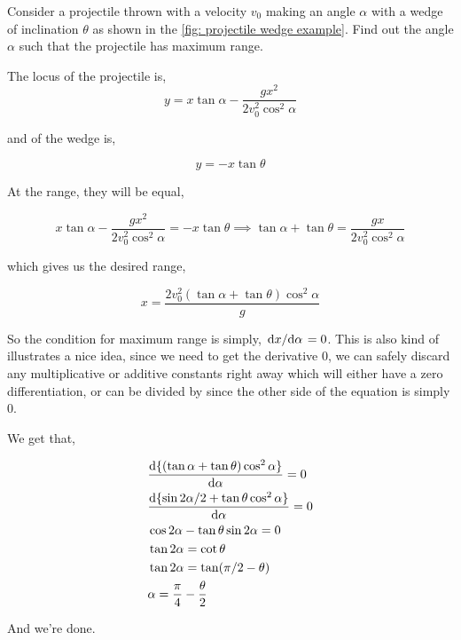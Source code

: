 \begin{example}
Consider a projectile thrown with a velocity \(v_0\) making an angle \(\alpha\) with 
a wedge of inclination \(\theta\) as shown in the \cref{fig: projectile wedge example}. Find out the angle \(\alpha\) 
such that the projectile has maximum range.    

\begin{soln}
    The locus of the projectile is, 
    \begin{equation*}
        y = x\tan\alpha - \frac{gx^2}{2v_0^2\cos^2\alpha}
    \end{equation*}

    and of the wedge is, 

    \begin{equation*}
        y = -x\tan\theta
    \end{equation*}

    At the range, they will be equal,

    \begin{equation*}
        x\tan\alpha - \frac{gx^2}{2v_0^2\cos^2\alpha} = -x\tan\theta \implies 
        \tan\alpha + \tan\theta = \frac{gx}{2v_0^2\cos^2\alpha}
    \end{equation*}

    which gives us the desired range, 

    \begin{equation*}
        x = \frac{2v_0^2(\tan\alpha + \tan\theta)\cos^2\alpha}{g}
    \end{equation*}

    So the condition for maximum range is simply, \(\dv*{x}{\alpha} = 0\). This is also 
    kind of illustrates a nice idea, since we need to get the derivative \(0\), we
    can safely discard any multiplicative or additive constants right away which will 
    either have a zero differentiation, or can be divided by since the other side of the 
    equation is simply \(0\). 
    
    We get that, 

    \begin{align*}
        &\dv{\{(\tan\alpha + \tan\theta)\cos^2\alpha\}}{\alpha} = 0 \\
        &\dv{\{\sin 2\alpha/2 + \tan\theta\cos^2\alpha\}}{\alpha} = 0 \\
        &\cos 2\alpha - \tan\theta\sin 2\alpha = 0 \\
        &\tan 2\alpha = \cot\theta \\
        &\tan 2\alpha = \tan (\pi/2 - \theta) \\
        &\alpha = \frac{\pi}{4} - \frac{\theta}{2}
    \end{align*}

    And we're done.
\end{soln}
\end{example}


